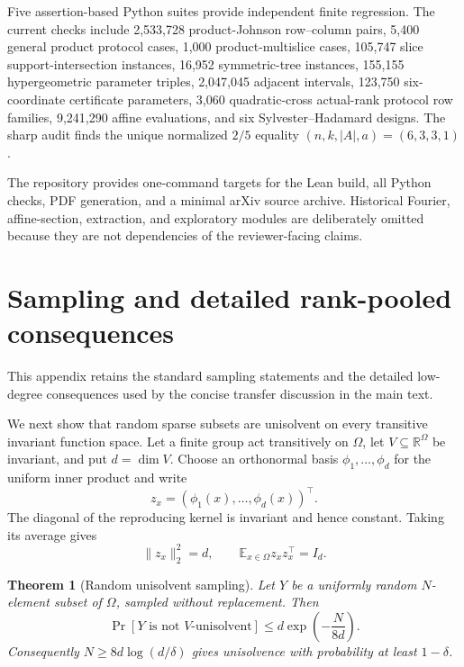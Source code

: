 \documentclass[11pt]{article}
\newtheorem{theorem}{Theorem}[section]
\theoremstyle{definition}
\theoremstyle{remark}
\newcommand{\R}{\mathbb R}
\newcommand{\1}{\mathbf 1}
\begin{document}
Five assertion-based Python suites provide independent finite regression.
The current checks include 2,533,728 product-Johnson row--column pairs, 5,400
general product protocol cases, 1,000 product-multislice cases, 105,747 slice
support-intersection instances, 16,952 symmetric-tree instances, 155,155
hypergeometric parameter triples, 2,047,045 adjacent intervals, 123,750
six-coordinate certificate parameters, 3,060 quadratic-cross actual-rank
protocol row families, 9,241,290 affine evaluations, and six
Sylvester--Hadamard designs.  The sharp audit finds the unique normalized
$2/5$ equality $(n,k,|A|,a)=(6,3,3,1)$.

The repository provides one-command targets for the Lean build, all Python
checks, PDF generation, and a minimal arXiv source archive.  Historical
Fourier, affine-section, extraction, and exploratory modules are deliberately
omitted because they are not dependencies of the reviewer-facing claims.


\appendix

\section{Sampling and detailed rank-pooled consequences}
\label{app:sampling-query}

This appendix retains the standard sampling statements and the detailed
low-degree consequences used by the concise transfer discussion in the main
text.

We next show that random sparse subsets are unisolvent on every transitive
invariant function space.  Let a finite group act transitively on $\Omega$,
let $V\subseteq\R^\Omega$ be invariant, and put $d=\dim V$.  Choose an
orthonormal basis $\phi_1,\ldots,\phi_d$ for the uniform inner product and
write
\[
 z_x=(\phi_1(x),\ldots,\phi_d(x))^\top.
\]
The diagonal of the reproducing kernel is invariant and hence constant.
Taking its average gives
\begin{equation}\label{eq:constant-leverage}
 \|z_x\|_2^2=d,
 \qquad
 \mathbb E_{x\in\Omega}z_xz_x^\top=I_d.
\end{equation}

\begin{theorem}[Random unisolvent sampling]
\label{thm:random-unisolvent}
Let $Y$ be a uniformly random $N$-element subset of $\Omega$, sampled
without replacement.  Then
\[
 \Pr[Y\text{ is not }V\text{-unisolvent}]
 \le d\exp\left(-\frac{N}{8d}\right).
\]
Consequently $N\ge8d\log(d/\delta)$ gives unisolvence with probability at
least $1-\delta$.
\end{theorem}
\end{document}
